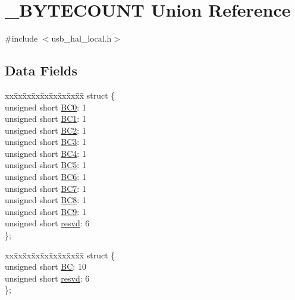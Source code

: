 \hypertarget{union___b_y_t_e_c_o_u_n_t}{}\section{\+\_\+\+B\+Y\+T\+E\+C\+O\+U\+N\+T Union Reference}
\label{union___b_y_t_e_c_o_u_n_t}


{\ttfamily \#include $<$usb\+\_\+hal\+\_\+local.\+h$>$}

\subsection*{Data Fields}
\begin{DoxyCompactItemize}
\item 
\begin{tabbing}
xx\=xx\=xx\=xx\=xx\=xx\=xx\=xx\=xx\=\kill
struct \{\\
\>unsigned short \hyperlink{union___b_y_t_e_c_o_u_n_t_a01f9bedad3eca024129aa48ba7bfea87}{BC0}: 1\\
\>unsigned short \hyperlink{union___b_y_t_e_c_o_u_n_t_a17606c78aac4f5fb568d104e134378bc}{BC1}: 1\\
\>unsigned short \hyperlink{union___b_y_t_e_c_o_u_n_t_a79dd7b432e492b89608ac9f89c1daed0}{BC2}: 1\\
\>unsigned short \hyperlink{union___b_y_t_e_c_o_u_n_t_afa61d0e57d43d4f3f3608c0367ae7437}{BC3}: 1\\
\>unsigned short \hyperlink{union___b_y_t_e_c_o_u_n_t_a70b62fb2a0858fd090ac06ba2418e456}{BC4}: 1\\
\>unsigned short \hyperlink{union___b_y_t_e_c_o_u_n_t_a7e3c6866f989c2c76bb59cd1d1d9efad}{BC5}: 1\\
\>unsigned short \hyperlink{union___b_y_t_e_c_o_u_n_t_a56573e0ab524655569e3ca5982ee32dd}{BC6}: 1\\
\>unsigned short \hyperlink{union___b_y_t_e_c_o_u_n_t_a346a9190c422dc01c8ab2fbf8d45a470}{BC7}: 1\\
\>unsigned short \hyperlink{union___b_y_t_e_c_o_u_n_t_a7e1a2cb638b416d81d578886794c1a96}{BC8}: 1\\
\>unsigned short \hyperlink{union___b_y_t_e_c_o_u_n_t_a641cf1be1a1607146c77efef0b75bbe9}{BC9}: 1\\
\>unsigned short \hyperlink{union___b_y_t_e_c_o_u_n_t_ae3dc0e4d24d0518699d8f081ba58f91c}{resvd}: 6\\
\}; \\

\end{tabbing}\item 
\begin{tabbing}
xx\=xx\=xx\=xx\=xx\=xx\=xx\=xx\=xx\=\kill
struct \{\\
\>unsigned short \hyperlink{union___b_y_t_e_c_o_u_n_t_a4d0dba525767a6f06c706153021d9890}{BC}: 10\\
\>unsigned short \hyperlink{union___b_y_t_e_c_o_u_n_t_ae3dc0e4d24d0518699d8f081ba58f91c}{resvd}: 6\\
\}; \\

\end{tabbing}\end{DoxyCompactItemize}


